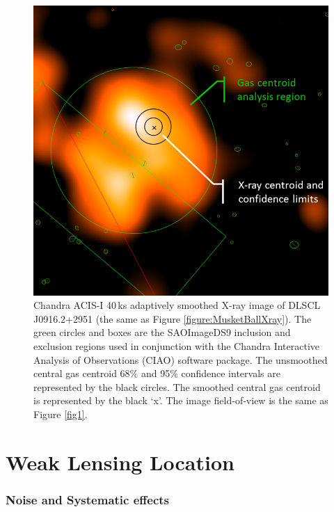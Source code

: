 \begin{figure}
\centering
\includegraphics[width=5in]{Chapter4/XrayCentRegions_reformat.png}
\caption[Musket Ball Cluster X-ray map with estimated centroid.]{
Chandra ACIS-I 40\,ks adaptively smoothed X-ray image of DLSCL J0916.2+2951 (the same as Figure \ref{figure:MusketBallXray}).
The green circles and boxes are the SAOImageDS9 inclusion and exclusion regions used in conjunction with the Chandra Interactive Analysis of Observations (CIAO) software package.
The unsmoothed central gas centroid 68\% and 95\% confidence intervals are represented by the black circles.
The smoothed central gas centroid is represented by the black `x'.
The image field-of-view is the same as Figure \ref{fig1}.
}
\label{figure:XrayCentroid}
\end{figure}


\section{Weak Lensing Location}

\subsubsection{Noise and Systematic effects}

